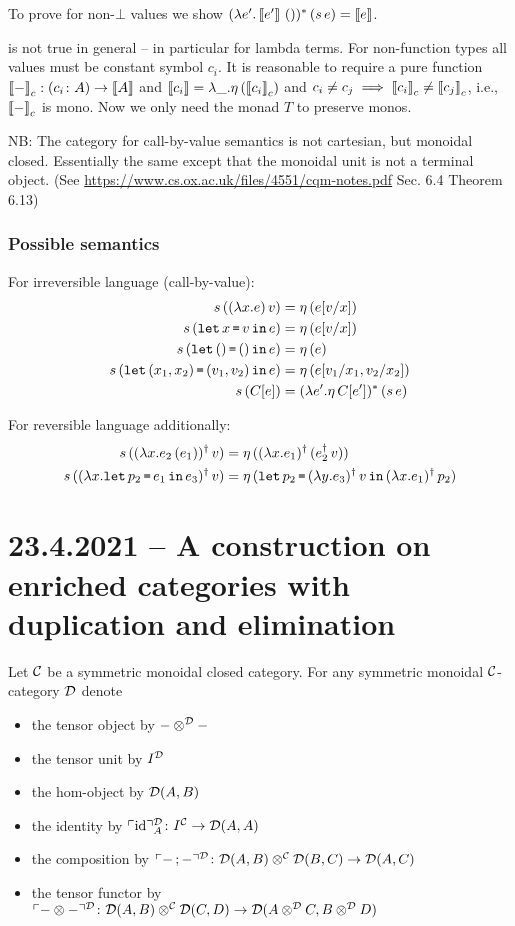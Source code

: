 \documentclass[runningheads,envcountsame]{llncs}
\begin{document}
To prove  for non-$\bot$ values we show $(\lambda e'. \sem{e'}\,())^*\,(s\,e) = \sem{e}$.

 is not true in general -- in particular for lambda terms. For non-function types all values must be constant symbol $c_i$. It is reasonable to require a pure function $\sem{-}_c: (c_i\colon A) \to \sem{A}$ and $\sem{c_i} = \lambda \_. \eta\,(\sem{c_i}_c)$ and $c_i \neq c_j \implies \sem{c_i}_c \neq \sem{c_j}_c$, i.e., $\sem{-}_c$ is mono. Now we only need the monad $T$ to preserve monos.

NB: The category for call-by-value semantics is not cartesian, but monoidal closed. Essentially the same except that the monoidal unit is not a terminal object. (See \url{https://www.cs.ox.ac.uk/files/4551/cqm-notes.pdf} Sec. 6.4 Theorem 6.13)

\subsubsection{Possible semantics}
For irreversible language (call-by-value):
\begin{align}
    s\,((\lambda x. e)\,v) &= \eta\,(e[v/x]) \\
    s\,(\texttt{let}\,x\,\texttt{=}\,v\,\texttt{in}\,e) &= \eta\,(e[v/x]) \\
    s\,(\texttt{let}\,()\,\texttt{=}\,()\,\texttt{in}\,e) &= \eta\,(e) \\
    s\,(\texttt{let}\,(x_1, x_2)\,\texttt{=}\,(v_1, v_2)\,\texttt{in}\,e) &= \eta\,(e[v_1/x_1, v_2/x_2]) \\
    s\,(C[e]) &= (\lambda e'. \eta\,C[e'])^*\,(s\,e)
\end{align}

For reversible language additionally:
\begin{align}
    s\,(\rev{(\lambda x. e_2\,(e_1))}\,v) &= \eta\,(\rev{(\lambda x. e_1)}\,(\rev{e_2}\,v)) \\
    s\,(\rev{(\lambda x. \elet{p_2}{e_1}{e_3})}\,v) &= \eta\,(\elet{p_2}{\rev{(\lambda y. e_3)}\,v}{\rev{(\lambda x. e_1)}\,p_2})
\end{align}

\section{23.4.2021 -- A construction on enriched categories with duplication and elimination}

Let $\mathcal{C}$ be a symmetric monoidal closed category. For any symmetric monoidal $\mathcal{C}$-category $\mathcal{D}$ denote 
\begin{itemize}
    \item the tensor object by $\tensor[\D]{-}{-}$
    \item the tensor unit by $I^{\mathcal{D}}$
    \item the hom-object by $\mathcal{D}(A, B)$
    \item the identity by $\name[\D]{\id}_A\colon I^\C \to \homD{A}{A}$
    \item the composition by $\name[\D]{\comp{-}{-}}\colon \tensor[\C]{\homD{A}{B}}{\homD{B}{C}} \to \homD{A}{C}$
    \item the tensor functor by $\name[\D]{\tensor{-}{-}}\colon \tensor[\C]{\homD{A}{B}}{\homD{C}{D}} \to \homD{\tensor[\D]{A}{C}}{\tensor[\D]{B}{D}}$
\end{itemize}
\end{document}
